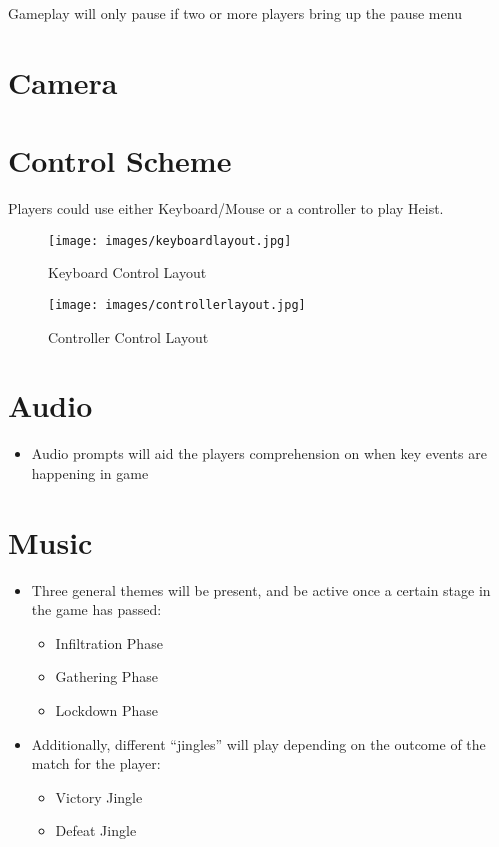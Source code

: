 \documentclass[10pt]{report}
\begin{document}
Gameplay will only pause if two or more players bring up the pause menu


\section{Camera}


\section{Control Scheme}

Players could use either Keyboard/Mouse or a controller to play Heist.

\begin{figure}[H]
	\texttt{[image: images/keyboardlayout.jpg]}
    \caption{Keyboard Control Layout}
\end{figure}

\begin{figure}[H]
	\texttt{[image: images/controllerlayout.jpg]}
    \caption{Controller Control Layout}
\end{figure}

\section{Audio}

\begin{itemize}
    \item Audio prompts will aid the players comprehension on when key events are happening in game
\end{itemize}

\section{Music}

\begin{itemize}
    \item Three general themes will be present, and be active once a certain stage in the game has passed:
    \begin{itemize}
        \item Infiltration Phase
        \item Gathering Phase
        \item Lockdown Phase
    \end{itemize}
    \item Additionally, different “jingles” will play depending on the outcome of the match for the player:
    \begin{itemize}
        \item Victory Jingle
        \item Defeat Jingle
    \end{itemize}
\end{itemize}
\end{document}
